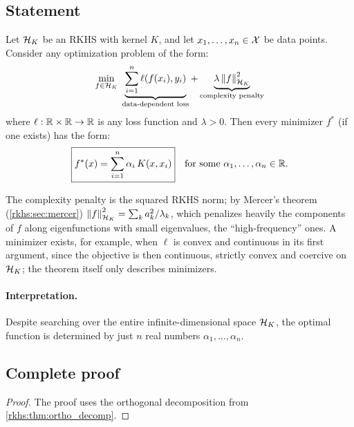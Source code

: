 \begin{notechapter}
\subsection{Statement}

\begin{theorem}
\label{rkhs:thm:representer}
Let $\mathcal{H}_K$ be an RKHS with kernel $K$, and let $x_1, \ldots, x_n \in \mathcal{X}$
be data points. Consider any optimization problem of the form:
\begin{equation}
\label{rkhs:eq:representer_problem}
\min_{f \in \mathcal{H}_K}\;
\underbrace{\sum_{i=1}^n \ell(f(x_i), y_i)}_{\text{data-dependent loss}}
+ \underbrace{
  \lambda \left\|f\right\|_{\mathcal{H}_K}^2}_{\text{complexity penalty}}
\end{equation}
where $\ell: \mathbb{R} \times \mathbb{R} \to \mathbb{R}$ is any loss function and $\lambda >
0$. Then every minimizer $f^*$ (if one exists) has the form:
\begin{equation}
\label{rkhs:eq:representer_solution}
\boxed{f^*(x) = \sum_{i=1}^n \alpha_i\, K(x, x_i)} \quad \text{for some } \alpha_1, \ldots, \alpha_n \in \mathbb{R}.
\end{equation}
\end{theorem}

The complexity penalty is the squared RKHS norm; by Mercer's theorem (\cref{rkhs:sec:mercer}) $\left\|f\right\|_{\mathcal{H}_K}^2 = \sum_k a_k^2/\lambda_k$, which penalizes heavily the components of $f$ along eigenfunctions with small eigenvalues, the ``high-frequency'' ones. A minimizer exists, for example, when $\ell$ is convex and continuous in its first argument, since the objective is then continuous, strictly convex and coercive on $\mathcal{H}_K$; the theorem itself only describes minimizers.

\paragraph{Interpretation.} Despite searching over the entire
infinite-dimensional space $\mathcal{H}_K$, the optimal function is determined by
just $n$ real numbers $\alpha_1, \ldots, \alpha_n$.

\subsection{Complete proof}

\begin{proof}
The proof uses the orthogonal decomposition from \cref{rkhs:thm:ortho_decomp}.


\end{proof}
\end{notechapter}
